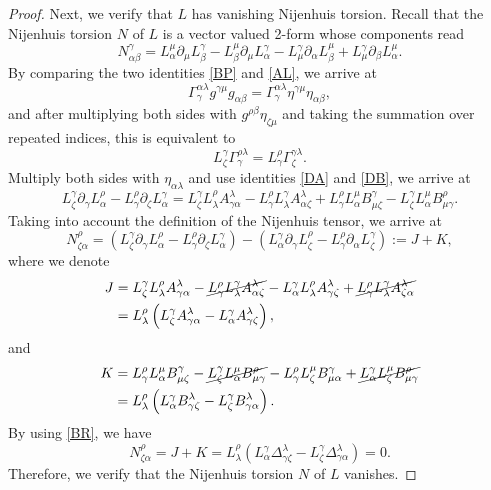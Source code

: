 \documentclass[10pt,a4paper]{amsart}
\newcommand{\Qd}{\Delta}
\newcommand{\Qg}{\Gamma}
\newcommand{\kk}[1]{\left(#1\right)}
\newcommand{\qa}{\alpha}
\newcommand{\qb}{\beta}
\newcommand{\qg}{\gamma}
\newcommand{\ql}{\lambda}
\newcommand{\qp}{\partial}
\newcommand{\qz}{\zeta}
\begin{document}
\begin{proof}
Next, we verify that $L$ has vanishing Nijenhuis torsion. Recall that the Nijenhuis torsion $N$ of $L$ is a vector valued 2-form whose components read 
\[
N^\qg_{\qa\qb} = L^\mu_\qa\qp_\mu L^\qg_\qb-L^\mu_\qb\qp_\mu L^\qg_\qa-L^\qg_\mu\qp_\qa L^\mu_\qb+L^\qg_\mu\qp_\qb L^\mu_\qa.
\]
By comparing the two identities \eqref{BP} and \eqref{AL}, we arrive at 
\[
\Qg^{\qa\ql}_\qg g^{\qg\mu}g_{\qa\qb} = \Qg^{\qa\ql}_\qg \eta^{\qg\mu}\eta_{\qa\qb},
\]
and after multiplying both sides with $g^{\rho\qb}\eta_{\qz\mu}$ and taking the summation over repeated indices, this is equivalent to 
\[
L^\qg_\qz \Qg^{\rho\ql}_\qg = L^\rho_\qg\Qg^{\qg\ql}_\qz.
\]
Multiply both sides with $\eta_{\qa\ql}$ and use identities \eqref{DA} and \eqref{DB}, we arrive at 
\begin{equation*}
  \label{BS}
L^\qg_\qz\qp_\qg L^\rho_\qa-L^\rho_\qg\qp_\qz L^\qg_\qa = L^\qg_\qz L^\rho_\ql A^\ql_{\qg\qa}-L^\rho_\qg L^\qg_\ql A^\ql_{\qa\qz}+L^\rho_\qg L^\mu_\qa B^\qg_{\mu\qz}-L^\qg_\qz L^\mu_\qa B^\rho_{\mu\qg}.
\end{equation*}
Taking into account the definition of the Nijenhuis tensor, we arrive at 
\[
N^\rho_{\qz\qa} = \kk{L^\qg_\qz\qp_\qg L^\rho_\qa-L^\rho_\qg\qp_\qz L^\qg_\qa}-\kk{L^\qg_\qa\qp_\qg L^\rho_\qz-L^\rho_\qg\qp_\qa L^\qg_\qz}:=J+K,
\]
where we denote 
\begin{align*}
  J &= L^\qg_\qz L^\rho_\ql A^\ql_{\qg\qa}-\cancel{L^\rho_\qg L^\qg_\ql A^\ql_{\qa\qz}}-L^\qg_\qa L^\rho_\ql A^\ql_{\qg\qz}+\cancel{L^\rho_\qg L^\qg_\ql A^\ql_{\qz\qa}}\\
  &=L^\rho_\ql\kk{L^\qg_\qz  A^\ql_{\qg\qa}-L^\qg_\qa  A^\ql_{\qg\qz}},
\end{align*}
and 
\begin{align*}
  K&=L^\rho_\qg L^\mu_\qa B^\qg_{\mu\qz}-\cancel{L^\qg_\qz L^\mu_\qa B^\rho_{\mu\qg}}-L^\rho_\qg L^\mu_\qz B^\qg_{\mu\qa}+\cancel{L^\qg_\qa L^\mu_\qz B^\rho_{\mu\qg}}\\
  &=L^\rho_\ql \kk{L^\qg_\qa B^\ql_{\qg\qz}- L^\qg_\qz B^\ql_{\qg\qa}}.
\end{align*}
By using \eqref{BR}, we have 
\[
N^\rho_{\qz\qa} = J+K = L^\rho_\ql\kk{L^\qg_\qa \Qd^\ql_{\qg\qz}-L^\qg_\qz\Qd^\ql_{\qg\qa}} = 0.
\]
Therefore, we verify that the Nijenhuis torsion $N$ of $L$ vanishes.


\end{proof}
\end{document}
